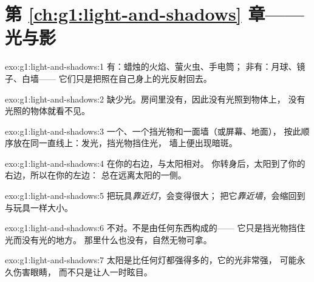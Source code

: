 \section*{第 \ref{ch:g1:light-and-shadows} 章——光与影}

\begin{solution}{exo:g1:light-and-shadows:1}
有：蜡烛的火焰、萤火虫、手电筒；
非有：月球、镜子、白墙——
它们只是把照在自己身上的光反射回去。
\end{solution}

\begin{solution}{exo:g1:light-and-shadows:2}
缺少光。房间里没有，因此没有光照到物体上，
没有光照的物体就看不见。
\end{solution}

\begin{solution}{exo:g1:light-and-shadows:3}
一个、一个挡光物和一面墙（或屏幕、地面），
按此顺序放在同一直线上：发光，挡光物挡住光，
墙上便出现暗斑。
\end{solution}

\begin{solution}{exo:g1:light-and-shadows:4}
在你的右边，与太阳相对。
你转身后，太阳到了你的右边，所以在你的左边：
总在远离太阳的一侧。
\end{solution}

\begin{solution}{exo:g1:light-and-shadows:5}
把玩具\emph{靠近灯}，会变得很大；
把它\emph{靠近墙}，会缩回到与玩具一样大小。
\end{solution}

\begin{solution}{exo:g1:light-and-shadows:6}
不对。不是由任何东西构成的——
它只是挡光物挡住光而没有光的地方。
那里什么也没有，自然无物可拿。
\end{solution}

\begin{solution}{exo:g1:light-and-shadows:7}
太阳是比任何灯都强得多的，它的光非常强，
可能永久伤害眼睛，
而不只是让人一时眩目。
\end{solution}

